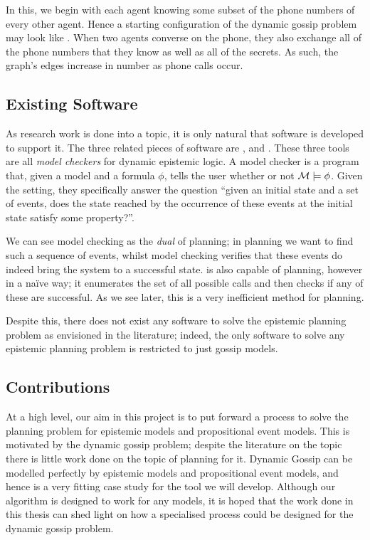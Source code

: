 \documentclass[12pt, a4paper]{article}
\begin{document}
In this, we begin with each agent knowing some subset of the phone
numbers of every other agent. Hence a starting configuration of the dynamic
gossip problem may look like . When two agents
converse on the phone, they also exchange all of the phone numbers that they
know as well as all of the secrets. As such, the graph's edges increase in
number as phone calls occur.

\subsection{Existing Software}

As research work is done into a topic, it is only natural that software is
developed to support it. The three related pieces of software are
\cite{DEMO-S5}, \cite{SMCDEL} and \cite{GithubGossip}. These three tools are all
\textit{model checkers} for dynamic epistemic logic. A model checker is a
program that, given a model  and a formula $\phi$, tells the user whether
or not $\mathcal{M} \models \phi$. Given the setting, they specifically answer the
question ``given an initial state and a set of events, does the state reached by
the occurrence of these events at the initial state satisfy some property?''.

We can see model checking as the \textit{dual} of planning; in planning we want
to find such a sequence of events, whilst model checking verifies that these
events do indeed bring the system to a successful state. \cite{GithubGossip} is
also capable of planning, however in a na{\"i}ve way; it enumerates the set of
all possible calls and then checks if any of these are successful. As we see
later, this is a very inefficient method for planning. 

Despite this, there does not exist any software to solve the epistemic planning
problem as envisioned in the literature; indeed, the only software to solve any
epistemic planning problem is restricted to just gossip models.

\subsection{Contributions}

At a high level, our aim in this project is to put forward a process to solve
the planning problem for epistemic models and propositional event models. This
is motivated by the dynamic gossip problem; despite the literature on the topic
there is little work done on the topic of planning for it. Dynamic Gossip can be
modelled perfectly by epistemic models and propositional event models, and hence
is a very fitting case study for the tool we will develop. Although our
algorithm is designed to work for any models, it is hoped that the work done in
this thesis can shed light on how a specialised process could be designed for
the dynamic gossip problem.
\end{document}
